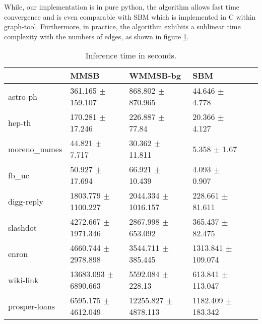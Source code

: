 \begin{figure}[h]
\centering
	
    \label{fig:conv_entropy}
\end{figure}

While, our implementation is in pure python, the algorithm allows fast time convergence and is even comparable with SBM which is implemented in C within graph-tool. Furthermore, in practice, the algorithm exhibits a sublinear time complexity with the numbers of edges, as shown in figure \ref{table:time}.

\begin{table}[h]
\begin{tabular}{llllll}
\hline
                    & MMSB                  & WMMSB-bg              & SBM                  \\
\hline
astro-ph      & 361.165 $\pm$ 159.107    & 868.802 $\pm$ 870.965    & 44.646 $\pm$ 4.778      \\
hep-th        & 170.281 $\pm$ 17.246     & 226.887 $\pm$ 77.84      & 20.366 $\pm$ 4.127      \\
moreno\_names  & 44.821 $\pm$ 7.717       & 30.362 $\pm$ 11.811      & 5.358 $\pm$ 1.67        \\
fb\_uc         & 50.927 $\pm$ 17.694      & 66.921 $\pm$ 10.439      & 4.093 $\pm$ 0.907       \\
digg-reply    & 1803.779 $\pm$ 1100.227  & 2044.334 $\pm$ 1016.157  & 228.661 $\pm$ 81.611    \\
slashdot      & 4272.667 $\pm$ 1971.346  & 2867.998 $\pm$ 653.092   & 365.437 $\pm$ 82.475    \\
enron         & 4660.744 $\pm$ 2978.898  & 3544.711 $\pm$ 385.445   & 1313.841 $\pm$ 109.074  \\
wiki-link     & 13683.093 $\pm$ 6890.663 & 5592.084 $\pm$ 228.13    & 613.841 $\pm$ 113.047   \\
prosper-loans & 6595.175 $\pm$ 4612.049  & 12255.827 $\pm$ 4878.113 & 1182.409 $\pm$ 183.342  \\
\hline
\end{tabular}
\label{table:time}
\caption{Inference time in seconds.}
\end{table}



%
%
%






